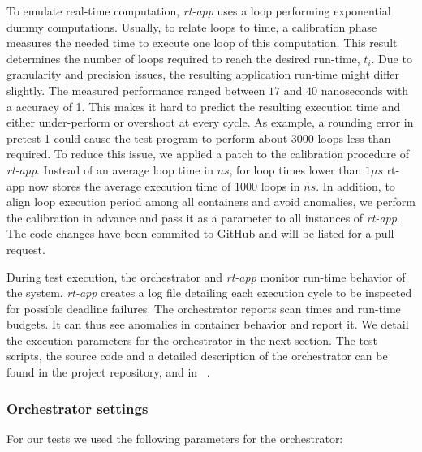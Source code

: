 \documentclass[]{scrartcl}
\begin{document}
To emulate real-time computation, \emph{rt-app} uses a loop performing exponential dummy computations. 
Usually, to relate loops to time, a calibration phase measures the needed time to execute one loop of this computation.
This result determines the number of loops required to reach the desired run-time, $t_i$. 
Due to granularity and precision issues, the resulting application run-time might differ slightly.
The measured performance ranged between $17$ and $40$ nanoseconds with a accuracy of 1.
This makes it hard to predict the resulting execution time and either under-perform or overshoot at every cycle.
As example, a rounding error in pretest 1 could cause the test program to perform about 3000 loops less than required.
To reduce this issue, we applied a patch to the calibration procedure of \emph{rt-app}. 
Instead of an average loop time in $ns$, for loop times lower than $1\mu s$ rt-app now stores the average execution time of 1000 loops in $ns$.
In addition, to align loop execution period among all containers and avoid anomalies, we perform  the calibration in advance and pass it as a parameter to all instances of \emph{rt-app}.
The code changes have been commited to GitHub and will be listed for a pull request.

During test execution, the orchestrator and \emph{rt-app} monitor run-time behavior of the system.
\emph{rt-app} creates a log file detailing each execution cycle to be inspected for possible deadline failures.
The orchestrator reports scan times and run-time budgets. 
It can thus see anomalies in container behavior and report it.
We detail the execution parameters for the orchestrator in the next section.
The test scripts, the source code and a detailed description of the orchestrator can be found in the project repository, and in ~\cite{homep01}.

\subsubsection{Orchestrator settings}
\label{sub:orchset}

For our tests we used the following parameters for the orchestrator:
\end{document}
